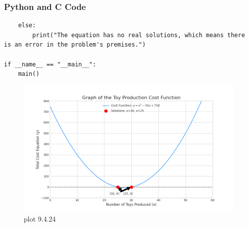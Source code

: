\documentclass{beamer}
\begin{document}
\begin{frame}[fragile]
\frametitle{Python and C Code}
\begin{lstlisting}
    else:
        print("The equation has no real solutions, which means there is an error in the problem's premises.")

if __name__ == "__main__":
    main()

\end{lstlisting}
\end{frame}
\begin{frame}
    \begin{figure}[H]
        \centering
        \includegraphics[width=0.75\columnwidth]{graph16.png}
        \caption{plot 9.4.24}
        \label{fig:placeholder}
    \end{figure}
\end{frame}
\end{document}
